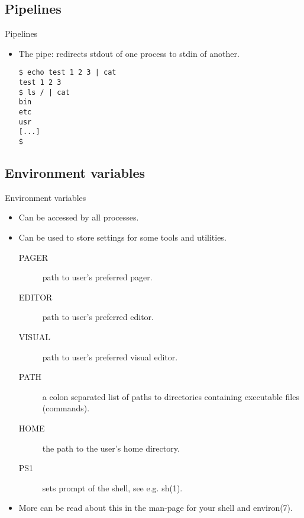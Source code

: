 \documentclass{beamer}
\begin{document}
\subsection{Pipelines}
\begin{frame}[fragile]{Pipelines}
	\begin{itemize}
		\item The pipe: redirects stdout of one process to stdin of another.
			\begin{lstlisting}
$ echo test 1 2 3 | cat
test 1 2 3
$ ls / | cat
bin
etc
usr
[...]
$
			\end{lstlisting}
	\end{itemize}
\end{frame}

\subsection{Environment variables}
\begin{frame}{Environment variables}
	\begin{itemize}
		\item<1> Can be accessed by all processes.
		\item<2> Can be used to store settings for some tools and utilities.
			\begin{description}
				\item[PAGER] path to user's preferred pager.
				\item[EDITOR] path to user's preferred editor.
				\item[VISUAL] path to user's preferred visual editor.
				\item[PATH] a colon separated list of paths to directories containing 
					executable files (commands).
				\item[HOME] the path to the user's home directory.
				\item[PS1] sets prompt of the shell, see e.g. sh(1).
			\end{description}
		\item<3> More can be read about this in the man-page for your shell and 
			environ(7).
	\end{itemize}
\end{frame}
\end{document}
